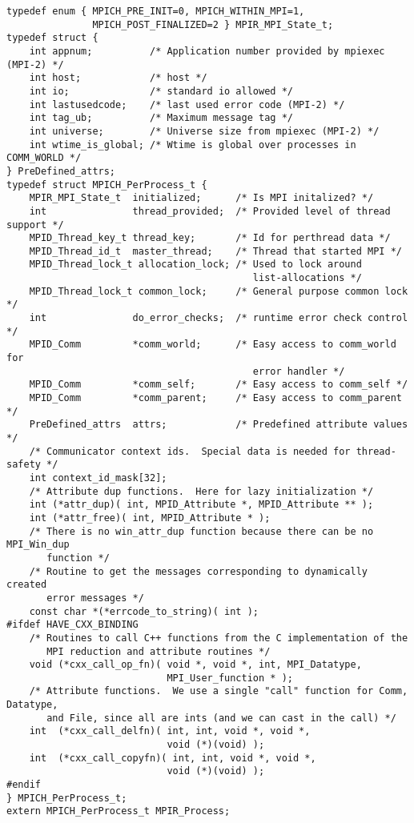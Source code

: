 \documentclass{article}
\begin{document}
\begin{verbatim}
typedef enum { MPICH_PRE_INIT=0, MPICH_WITHIN_MPI=1,
               MPICH_POST_FINALIZED=2 } MPIR_MPI_State_t;
typedef struct {
    int appnum;          /* Application number provided by mpiexec (MPI-2) */
    int host;            /* host */
    int io;              /* standard io allowed */
    int lastusedcode;    /* last used error code (MPI-2) */
    int tag_ub;          /* Maximum message tag */
    int universe;        /* Universe size from mpiexec (MPI-2) */
    int wtime_is_global; /* Wtime is global over processes in COMM_WORLD */
} PreDefined_attrs;
typedef struct MPICH_PerProcess_t {
    MPIR_MPI_State_t  initialized;      /* Is MPI initalized? */
    int               thread_provided;  /* Provided level of thread support */
    MPID_Thread_key_t thread_key;       /* Id for perthread data */
    MPID_Thread_id_t  master_thread;    /* Thread that started MPI */
    MPID_Thread_lock_t allocation_lock; /* Used to lock around 
                                           list-allocations */
    MPID_Thread_lock_t common_lock;     /* General purpose common lock */
    int               do_error_checks;  /* runtime error check control */
    MPID_Comm         *comm_world;      /* Easy access to comm_world for
                                           error handler */
    MPID_Comm         *comm_self;       /* Easy access to comm_self */
    MPID_Comm         *comm_parent;     /* Easy access to comm_parent */
    PreDefined_attrs  attrs;            /* Predefined attribute values */
    /* Communicator context ids.  Special data is needed for thread-safety */
    int context_id_mask[32];
    /* Attribute dup functions.  Here for lazy initialization */
    int (*attr_dup)( int, MPID_Attribute *, MPID_Attribute ** );
    int (*attr_free)( int, MPID_Attribute * );
    /* There is no win_attr_dup function because there can be no MPI_Win_dup
       function */
    /* Routine to get the messages corresponding to dynamically created
       error messages */
    const char *(*errcode_to_string)( int );
#ifdef HAVE_CXX_BINDING
    /* Routines to call C++ functions from the C implementation of the
       MPI reduction and attribute routines */
    void (*cxx_call_op_fn)( void *, void *, int, MPI_Datatype, 
                            MPI_User_function * );
    /* Attribute functions.  We use a single "call" function for Comm, Datatype,
       and File, since all are ints (and we can cast in the call) */
    int  (*cxx_call_delfn)( int, int, void *, void *, 
                            void (*)(void) );
    int  (*cxx_call_copyfn)( int, int, void *, void *, 
                            void (*)(void) );
#endif    
} MPICH_PerProcess_t;
extern MPICH_PerProcess_t MPIR_Process;
\end{verbatim}
\end{document}
